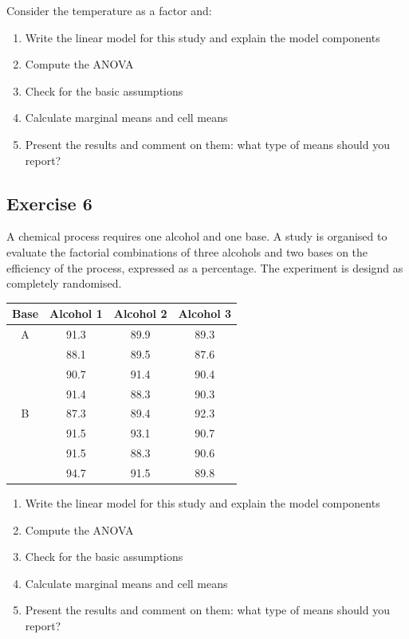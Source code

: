 \documentclass[a4paper,12pt,oneside]{book}
\providecommand{\tightlist}{%
  \setlength{\itemsep}{0pt}\setlength{\parskip}{0pt}}
\begin{document}
Consider the temperature as a factor and:

\begin{enumerate}
\def\labelenumi{\arabic{enumi}.}
\tightlist
\item
  Write the linear model for this study and explain the model components
\item
  Compute the ANOVA
\item
  Check for the basic assumptions
\item
  Calculate marginal means and cell means
\item
  Present the results and comment on them: what type of means should you report?
\end{enumerate}

\hypertarget{exercise-6-1}{%
\subsection{Exercise 6}\label{exercise-6-1}}

A chemical process requires one alcohol and one base. A study is organised to evaluate the factorial combinations of three alcohols and two bases on the efficiency of the process, expressed as a percentage. The experiment is designd as completely randomised.

\begin{longtable}[]{@{}cccc@{}}
\toprule
Base & Alcohol 1 & Alcohol 2 & Alcohol 3 \\
\midrule
\endhead
A & 91.3 & 89.9 & 89.3 \\
& 88.1 & 89.5 & 87.6 \\
& 90.7 & 91.4 & 90.4 \\
& 91.4 & 88.3 & 90.3 \\
B & 87.3 & 89.4 & 92.3 \\
& 91.5 & 93.1 & 90.7 \\
& 91.5 & 88.3 & 90.6 \\
& 94.7 & 91.5 & 89.8 \\
\bottomrule
\end{longtable}

\begin{enumerate}
\def\labelenumi{\arabic{enumi}.}
\tightlist
\item
  Write the linear model for this study and explain the model components
\item
  Compute the ANOVA
\item
  Check for the basic assumptions
\item
  Calculate marginal means and cell means
\item
  Present the results and comment on them: what type of means should you report?
\end{enumerate}
\end{document}
